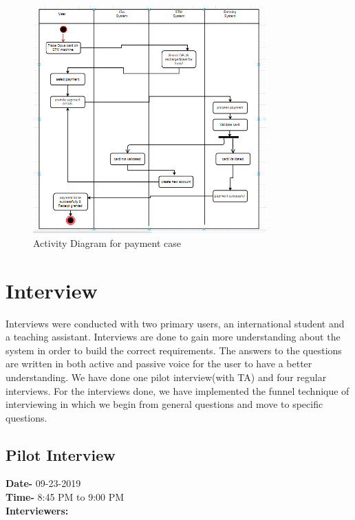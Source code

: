 \documentclass[11pt, english]{report}
\begin{document}
\begin{figure}[H]
  
  \includegraphics[width=0.8\textwidth]{images/Activity.PNG}
  \centering

   \caption{Activity Diagram for payment case}

\end{figure}




\appendix
\chapter{Interview}
Interviews\cite{interview} were conducted with two primary users, an international student and a teaching assistant. Interviews are done to gain more understanding about the system in order to build the correct requirements. The answers to the questions are written in both active and passive voice for the user to have a better understanding. We have done one pilot interview(with TA) and four regular interviews. For the interviews done, we have implemented the funnel technique of interviewing in which we begin from general questions and move to specific questions.


\section{Pilot Interview}
\textbf{Date-} 09-23-2019\\
\textbf{Time-} 8:45 PM to 9:00 PM\\
\textbf{Interviewers:}\\
\end{document}
